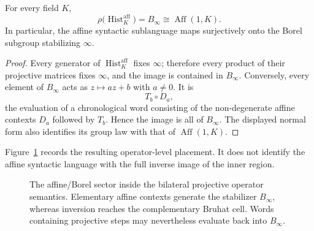 \begin{corollary}
\label{cor:affine-borel-sector}
For every field $K$,
\[
  \rho\bigl(\operatorname{Hist}^{\mathrm{aff}}_K\bigr)=B_\infty
  \cong\operatorname{Aff}(1,K).
\]
In particular, the affine syntactic sublanguage maps surjectively onto the
Borel subgroup stabilizing $\infty$.
\end{corollary}

\begin{proof}
Every generator of $\operatorname{Hist}^{\mathrm{aff}}_K$ fixes $\infty$;
therefore every product of their projective matrices fixes $\infty$, and the
image is contained in $B_\infty$.  Conversely, every element of $B_\infty$
acts as $z\mapsto az+b$ with $a\ne0$.  It is
\[
  T_b\circ D_a,
\]
the evaluation of a chronological word consisting of the non-degenerate
affine contexts $D_a$ followed by $T_b$.  Hence the image is all of
$B_\infty$.  The displayed normal form also identifies its group law with
that of $\operatorname{Aff}(1,K)$.
\end{proof}

Figure~\ref{fig:affine-sector-inside-projective} records the resulting
operator-level placement.  It does not identify the affine syntactic language
with the full inverse image of the inner region.

\begin{figure}[t]
\centering
{}
\caption{The affine/Borel sector inside the bilateral projective operator
semantics.  Elementary affine contexts generate the stabilizer $B_\infty$,
whereas inversion reaches the complementary Bruhat cell.  Words containing
projective steps may nevertheless evaluate back into $B_\infty$.}
\label{fig:affine-sector-inside-projective}
\end{figure}

